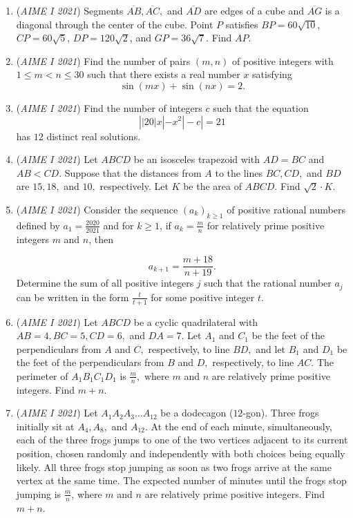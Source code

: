\begin{enumerate}
 

	\item (\textit{AIME I 2021}) Segments $\overline{AB}, \overline{AC},$ and $\overline{AD}$ are edges of a cube and $\overline{AG}$ is a diagonal through the center of the cube. Point $P$ satisfies $BP=60\sqrt{10}$, $CP=60\sqrt{5}$, $DP=120\sqrt{2}$, and $GP=36\sqrt{7}$. Find $AP.$


	\item (\textit{AIME I 2021}) Find the number of pairs $(m,n)$ of positive integers with $1\le m<n\le 30$ such that there exists a real number $x$ satisfying
 \[\sin(mx)+\sin(nx)=2.\]


	\item (\textit{AIME I 2021}) Find the number of integers $c$ such that the equation
 \[\left||20|x|-x^2|-c\right|=21\]has $12$ distinct real solutions.


 

	\item (\textit{AIME I 2021}) Let $ABCD$ be an isosceles trapezoid with $AD=BC$ and $AB<CD.$ Suppose that the distances from $A$ to the lines $BC,CD,$ and $BD$ are $15,18,$ and $10,$ respectively. Let $K$ be the area of $ABCD.$ Find $\sqrt2 \cdot K.$


	\item (\textit{AIME I 2021}) Consider the sequence $(a_k)_{k\ge 1}$ of positive rational numbers defined by $a_1 = \frac{2020}{2021}$ and for $k\ge 1$, if $a_k = \frac{m}{n}$ for relatively prime positive integers $m$ and $n$, then


 
 \[a_{k+1} = \frac{m + 18}{n+19}.\]Determine the sum of all positive integers $j$ such that the rational number $a_j$ can be written in the form $\frac{t}{t+1}$ for some positive integer $t$.


 

	\item (\textit{AIME I 2021}) Let $ABCD$ be a cyclic quadrilateral with $AB=4,BC=5,CD=6,$ and $DA=7.$ Let $A_1$ and $C_1$ be the feet of the perpendiculars from $A$ and $C,$ respectively, to line $BD,$ and let $B_1$ and $D_1$ be the feet of the perpendiculars from $B$ and $D,$ respectively, to line $AC.$ The perimeter of $A_1B_1C_1D_1$ is $\frac mn,$ where $m$ and $n$ are relatively prime positive integers. Find $m+n.$


	\item (\textit{AIME I 2021}) Let $A_1A_2A_3\ldots A_{12}$ be a dodecagon ($12$-gon). Three frogs initially sit at $A_4,A_8,$ and $A_{12}$. At the end of each minute, simultaneously, each of the three frogs jumps to one of the two vertices adjacent to its current position, chosen randomly and independently with both choices being equally likely. All three frogs stop jumping as soon as two frogs arrive at the same vertex at the same time. The expected number of minutes until the frogs stop jumping is $\frac mn$, where $m$ and $n$ are relatively prime positive integers. Find $m+n$.



\end{enumerate}
